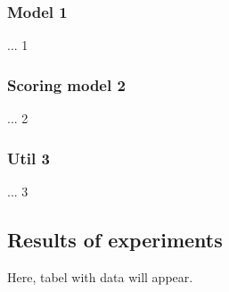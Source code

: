         \subsubsection{Model 1}  %
            ... 1

        \subsubsection{Scoring model 2}
            ... 2

        \subsubsection{Util 3}
            ... 3

    \subsection{Results of experiments}
        Here, tabel with data will appear.

